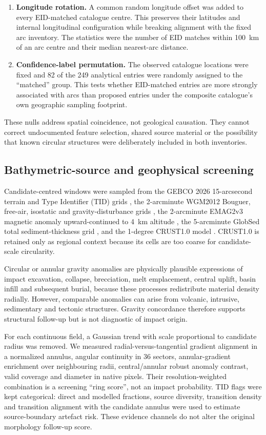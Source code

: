 \documentclass[11pt]{article}
\begin{document}
\begin{enumerate}
  \item \textbf{Longitude rotation.} A common random longitude offset was added to every EID-matched catalogue centre. This preserves their latitudes and internal longitudinal configuration while breaking alignment with the fixed arc inventory. The statistics were the number of EID matches within 100~km of an arc centre and their median nearest-arc distance.
  \item \textbf{Confidence-label permutation.} The observed catalogue locations were fixed and 82 of the 249 analytical entries were randomly assigned to the ``matched'' group. This tests whether EID-matched entries are more strongly associated with arcs than proposed entries under the composite catalogue's own geographic sampling footprint.
\end{enumerate}

These nulls address spatial coincidence, not geological causation. They cannot correct undocumented feature selection, shared source material or the possibility that known circular structures were deliberately included in both inventories.

\subsection{Bathymetric-source and geophysical screening}
Candidate-centred windows were sampled from the GEBCO 2026 15-arcsecond terrain and Type Identifier (TID) grids \cite{GEBCO2026}, the 2-arcminute WGM2012 Bouguer, free-air, isostatic and gravity-disturbance grids \cite{Bonvalot2012,Balmino2012}, the 2-arcminute EMAG2v3 magnetic anomaly upward-continued to 4~km altitude \cite{Meyer2017}, the 5-arcminute GlobSed total sediment-thickness grid \cite{Straume2019}, and the 1-degree CRUST1.0 model \cite{Laske2013}. CRUST1.0 is retained only as regional context because its cells are too coarse for candidate-scale circularity.

Circular or annular gravity anomalies are physically plausible expressions of impact excavation, collapse, brecciation, melt emplacement, central uplift, basin infill and subsequent burial, because these processes redistribute material density radially. However, comparable anomalies can arise from volcanic, intrusive, sedimentary and tectonic structures. Gravity concordance therefore supports structural follow-up but is not diagnostic of impact origin.

For each continuous field, a Gaussian trend with scale proportional to candidate radius was removed. We measured radial-versus-tangential gradient alignment in a normalized annulus, angular continuity in 36 sectors, annular-gradient enrichment over neighbouring radii, central/annular robust anomaly contrast, valid coverage and diameter in native pixels. Their resolution-weighted combination is a screening ``ring score'', not an impact probability. TID flags were kept categorical: direct and modelled fractions, source diversity, transition density and transition alignment with the candidate annulus were used to estimate source-boundary artefact risk. These evidence channels do not alter the original morphology follow-up score.
\end{document}
